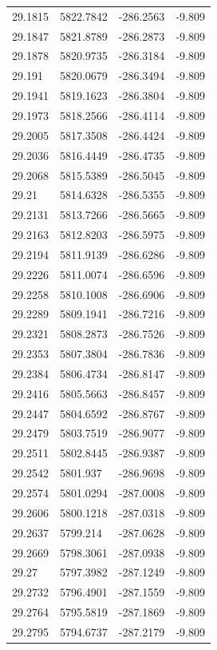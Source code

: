\begin{table}[H]
\begin{tabular}{llll}
29.1815 & 5822.7842 & -286.2563 & -9.809 \\
29.1847 & 5821.8789 & -286.2873 & -9.809 \\
29.1878 & 5820.9735 & -286.3184 & -9.809 \\
29.191 & 5820.0679 & -286.3494 & -9.809 \\
29.1941 & 5819.1623 & -286.3804 & -9.809 \\
29.1973 & 5818.2566 & -286.4114 & -9.809 \\
29.2005 & 5817.3508 & -286.4424 & -9.809 \\
29.2036 & 5816.4449 & -286.4735 & -9.809 \\
29.2068 & 5815.5389 & -286.5045 & -9.809 \\
29.21 & 5814.6328 & -286.5355 & -9.809 \\
29.2131 & 5813.7266 & -286.5665 & -9.809 \\
29.2163 & 5812.8203 & -286.5975 & -9.809 \\
29.2194 & 5811.9139 & -286.6286 & -9.809 \\
29.2226 & 5811.0074 & -286.6596 & -9.809 \\
29.2258 & 5810.1008 & -286.6906 & -9.809 \\
29.2289 & 5809.1941 & -286.7216 & -9.809 \\
29.2321 & 5808.2873 & -286.7526 & -9.809 \\
29.2353 & 5807.3804 & -286.7836 & -9.809 \\
29.2384 & 5806.4734 & -286.8147 & -9.809 \\
29.2416 & 5805.5663 & -286.8457 & -9.809 \\
29.2447 & 5804.6592 & -286.8767 & -9.809 \\
29.2479 & 5803.7519 & -286.9077 & -9.809 \\
29.2511 & 5802.8445 & -286.9387 & -9.809 \\
29.2542 & 5801.937 & -286.9698 & -9.809 \\
29.2574 & 5801.0294 & -287.0008 & -9.809 \\
29.2606 & 5800.1218 & -287.0318 & -9.809 \\
29.2637 & 5799.214 & -287.0628 & -9.809 \\
29.2669 & 5798.3061 & -287.0938 & -9.809 \\
29.27 & 5797.3982 & -287.1249 & -9.809 \\
29.2732 & 5796.4901 & -287.1559 & -9.809 \\
29.2764 & 5795.5819 & -287.1869 & -9.809 \\
29.2795 & 5794.6737 & -287.2179 & -9.809 \\

\end{tabular}
\end{table}
